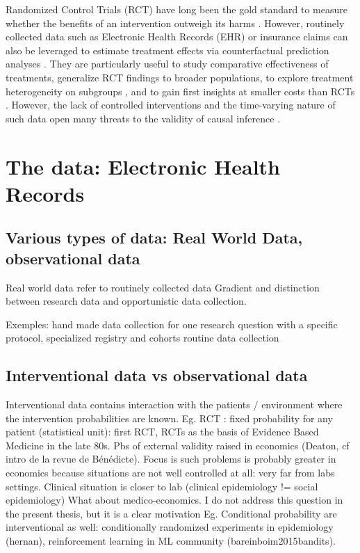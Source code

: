 \documentclass{report}
\begin{document}
%
Randomized Control Trials (RCT) have
long been the gold standard to measure whether the benefits of an intervention
outweigh its harms \citep{brook1986method}. However, routinely collected data
such as Electronic Health Records (EHR) or insurance claims
\citep{wang2023early} can also be leveraged to estimate treatment effects via
counterfactual prediction analyses \citep{hernan2019second}.  They are
particularly useful to study comparative effectiveness of treatments,
generalize RCT findings to broader populations, to explore treatment
heterogeneity on subgroups \citep{mant1999can,desai2021broadening}, and to
gain first insights at smaller costs than RCTs
\citep{black1996we,bosdriesz2020evidence}. However, the lack of controlled
interventions and the time-varying nature of such data open many threats to
the validity of causal inference \citep{bouvier2023should}.



\section{The data: Electronic Health Records}\label{sec:intro:data}

\subsection{Various types of data: Real World Data, observational data}\label{subsec:intro:real_world_data}

Real world data refer to routinely collected data
Gradient and distinction between research data and opportunistic data collection.

Exemples:
hand made data collection for one research question with a specific protocol,
specialized registry and cohorts
routine data collection


\subsection{Interventional data vs observational data}\label{subsec:intro:interventional_vs_observational}

Interventional data contains interaction with the patients / environment where the intervention probabilities are known.
Eg. RCT : fixed probability for any patient (statistical unit): first RCT, RCTs as the basis of Evidence Based Medicine in the late 80s.
Pbs of external validity raised in economics (Deaton, cf intro de la revue de Bénédicte). Focus is such problems is probably greater in economics because situations are not well controlled at all: very far from labs settings. Clinical situation is closer to lab (clinical epidemiology != social epidemiology)
What about medico-economics. I do not address this question in the present thesis, but it is a clear motivation
Eg. Conditional probability are interventional as well: conditionally randomized experiments in epidemiology (hernan), reinforcement learning in ML community (bareinboim2015bandits).
\end{document}
